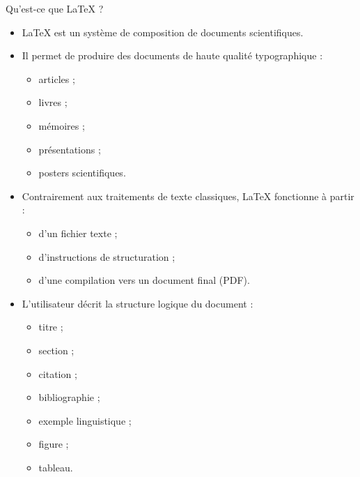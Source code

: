 \documentclass[aspectratio=169]{beamer}
\begin{document}
	\begin{frame}{Qu’est-ce que \LaTeX{} ?}
		\begin{itemize}
			\item \LaTeX{} est un système de composition de documents scientifiques.
			
			\vspace{0.3cm}
			
			\item Il permet de produire des documents de haute qualité typographique :
			\begin{itemize}
				\item articles ;
				\item livres ;
				\item mémoires ;
				\item présentations ;
				\item posters scientifiques.
			\end{itemize}
			
			\vspace{0.3cm}
			
			\item Contrairement aux traitements de texte classiques, \LaTeX{} fonctionne à partir :
			\begin{itemize}
				\item d’un fichier texte ;
				\item d’instructions de structuration ;
				\item d’une compilation vers un document final (PDF).
			\end{itemize}
			
			\vspace{0.3cm}
			
			\item L’utilisateur décrit la structure logique du document :
			\begin{itemize}
				\item titre ;
				\item section ;
				\item citation ;
				\item bibliographie ;
				\item exemple linguistique ;
				\item figure ;
				\item tableau.
			\end{itemize}
		\end{itemize}
	\end{frame}
	
	
\end{document}
